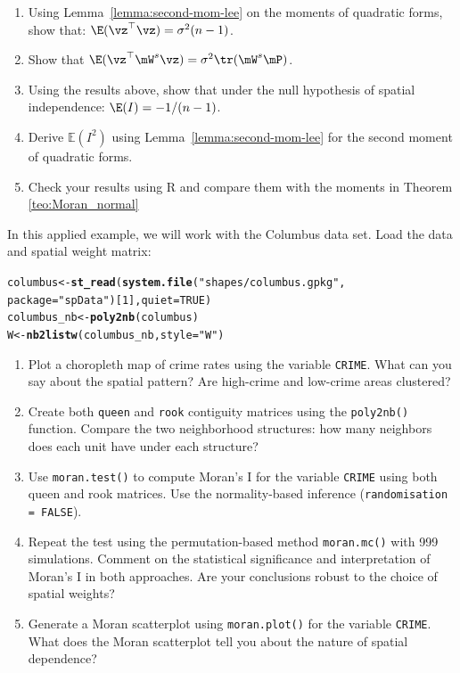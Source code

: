 \documentclass[english,12pt]{book}\usepackage[]{graphicx}\usepackage[]{xcolor}
\makeatletter
\newcommand{\hlnum}[1]{\textcolor[rgb]{0.686,0.059,0.569}{#1}}%
\newcommand{\hlsng}[1]{\textcolor[rgb]{0.192,0.494,0.8}{#1}}%
\newcommand{\hldef}[1]{\textcolor[rgb]{0.345,0.345,0.345}{#1}}%
\newcommand{\hlkwb}[1]{\textcolor[rgb]{0.69,0.353,0.396}{#1}}%
\newcommand{\hlkwc}[1]{\textcolor[rgb]{0.333,0.667,0.333}{#1}}%
\newcommand{\hlkwd}[1]{\textcolor[rgb]{0.737,0.353,0.396}{\textbf{#1}}}%
\newenvironment{kframe}{%
 \def\at@end@of@kframe{}%
 \ifinner\ifhmode%
  \def\at@end@of@kframe{\end{minipage}}%
  \begin{minipage}{\columnwidth}%
 \fi\fi%
 \def\FrameCommand##1{\hskip\@totalleftmargin \hskip-\fboxsep
 \colorbox{shadecolor}{##1}\hskip-\fboxsep
     \hskip-\linewidth \hskip-\@totalleftmargin \hskip\columnwidth}%
 \MakeFramed {\advance\hsize-\width
   \@totalleftmargin\z@ \linewidth\hsize
   \@setminipage}}%
 {\par\unskip\endMakeFramed%
 \at@end@of@kframe}
\newenvironment{knitrout}{}{} %
\makeatother
\begin{document}
\begin{exercises}
\begin{enumerate}
	  \item Using Lemma~\ref{lemma:second-mom-lee} on the moments of quadratic forms, show that: $\E(\vz^\top\vz) = \sigma^2(n - 1)$.
	  \item Show that $\E(\vz^\top\mW^s\vz) = \sigma^2\tr(\mW^s\mP)$.
	  \item Using the results above, show that under the null hypothesis of spatial independence: $\E(I) = - 1/ (n - 1)$.
	  \item Derive $\mathbb{E}(I^2)$ using Lemma~\ref{lemma:second-mom-lee} for the second moment of quadratic forms.
	  \item Check your results using R and compare them with the moments in Theorem \ref{teo:Moran_normal}
	 \end{enumerate}
	\exercise In this applied example, we will work with the Columbus data set. Load the data and spatial weight matrix:
\begin{knitrout}
\color{fgcolor}\begin{kframe}
\begin{alltt}
\hldef{columbus}      \hlkwb{<-} \hlkwd{st_read}\hldef{(}\hlkwd{system.file}\hldef{(}\hlsng{"shapes/columbus.gpkg"}\hldef{,}
                                     \hlkwc{package}\hldef{=}\hlsng{"spData"}\hldef{)[}\hlnum{1}\hldef{],} \hlkwc{quiet}\hldef{=}\hlnum{TRUE}\hldef{)}
\hldef{columbus_nb}   \hlkwb{<-} \hlkwd{poly2nb}\hldef{(columbus)}
\hldef{W}             \hlkwb{<-} \hlkwd{nb2listw}\hldef{(columbus_nb,} \hlkwc{style} \hldef{=} \hlsng{"W"}\hldef{)}
\end{alltt}
\end{kframe}
\end{knitrout}
  \begin{enumerate}
    \item Plot a choropleth map of crime rates using the variable \texttt{CRIME}. What can you say about the spatial pattern? Are high-crime and low-crime areas clustered?
    \item Create both \texttt{queen} and \texttt{rook} contiguity matrices using the \texttt{poly2nb()} function. Compare the two neighborhood structures: how many neighbors does each unit have under each structure?
    \item Use \texttt{moran.test()} to compute Moran's I for the variable \texttt{CRIME} using both queen and rook matrices. Use the normality-based inference (\texttt{randomisation = FALSE}).
    \item Repeat the test using the permutation-based method \texttt{moran.mc()} with 999 simulations. Comment on the statistical significance and interpretation of Moran's I in both approaches. Are your conclusions robust to the choice of spatial weights?
    \item Generate a Moran scatterplot using \texttt{moran.plot()} for the variable \texttt{CRIME}. What does the Moran scatterplot tell you about the nature of spatial dependence?
    \end{enumerate}


\end{exercises}
\end{document}
